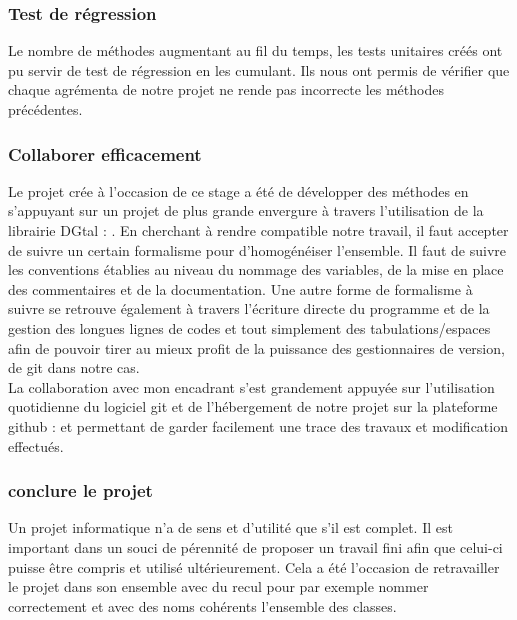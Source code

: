 \subsubsection{Test de régression}

Le nombre de méthodes augmentant au fil du temps, les tests unitaires créés ont pu servir de test de régression en les cumulant. Ils nous ont permis de vérifier que chaque agrémenta de notre projet ne rende pas incorrecte les méthodes précédentes.\\


\subsubsection{Collaborer efficacement}

Le projet crée à l'occasion de ce stage a été de développer des méthodes en s'appuyant sur un projet de plus grande envergure à travers l'utilisation de la librairie DGtal : \cite{DGtal}. En cherchant à rendre compatible notre travail, il faut accepter de suivre un certain formalisme pour d'homogénéiser l'ensemble. Il faut de suivre les conventions établies au niveau du nommage des variables, de la mise en place des commentaires et de la documentation. Une autre forme de formalisme à suivre se retrouve également à travers l'écriture directe du programme et de la gestion des longues lignes de codes et tout simplement des tabulations/espaces afin de pouvoir tirer au mieux profit de la puissance des gestionnaires de version, de git dans notre cas.\\

La collaboration avec mon encadrant s'est grandement appuyée sur l'utilisation quotidienne du logiciel git et de l’hébergement de notre projet sur la plateforme github : \cite{github-tristan} et \cite{github-thomas} permettant de garder facilement une trace des travaux et modification effectués.

\subsubsection{conclure le projet}

Un projet informatique n'a de sens et d'utilité que s'il est complet. Il est important dans un souci de pérennité de proposer un travail fini afin que celui-ci puisse être compris et utilisé ultérieurement. Cela a été l’occasion de retravailler le projet dans son ensemble avec du recul pour par exemple nommer correctement et avec des noms cohérents l'ensemble des classes.


